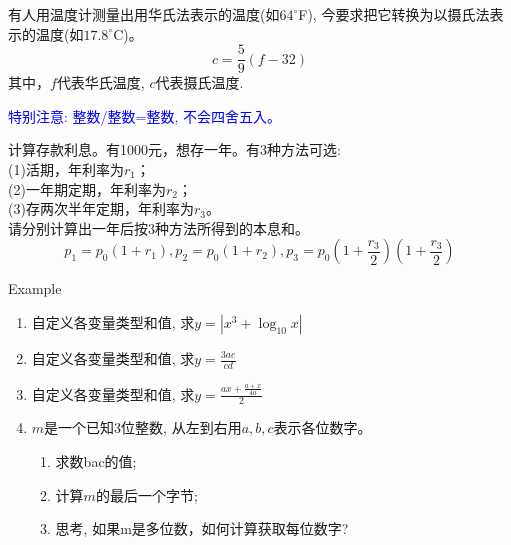 \begin{frame}[shrink]
\begin{example}[例3.1 p37]
	有人用温度计测量出用华氏法表示的温度(如$64^\circ$F), 
	今要求把它转换为以摄氏法表示的温度(如$17.8^\circ$C)。
	\[ c=\frac{5}{9}(f-32) \]
	其中，$f$代表华氏温度, $c$代表摄氏温度. 
	
	\textcolor{blue}{特别注意: 整数/整数=整数, 不会四舍五入。}
\end{example}
\begin{example}[例3.2 p38]
	计算存款利息。有1000元，想存一年。有3种方法可选:\\
	(1)活期，年利率为$r_1$；\\
	(2)一年期定期，年利率为$r_2$；\\
	(3)存两次半年定期，年利率为$r_3$。\\
	请分别计算出一年后按3种方法所得到的本息和。\\
	\[p_1=p_0(1+r_1),p_2=p_0(1+r_2),p_3=p_0(1+\frac{r_3}{2})(1+\frac{r_3}{2}) \]
\end{example}
\end{frame}

\begin{frame}[shrink]{Example}
\begin{enumerate}\itemsep=10pt
	\item 自定义各变量类型和值, 求$y=|x^3+\log_{10} x|$\\
	\item 自定义各变量类型和值, 求$y=\frac{3ae}{cd}$\\
	\item 自定义各变量类型和值, 求$y=\frac{ax+\frac{a+x}{4a}}{2}$\\
	\item $m$是一个已知3位整数, 从左到右用$a,b,c$表示各位数字。
	\begin{enumerate}[(1)]
		\item 求数bac的值; 
		\item 计算$m$的最后一个字节;
		\item 思考, 如果m是多位数，如何计算获取每位数字?
	\end{enumerate}
\end{enumerate}
\end{frame}


